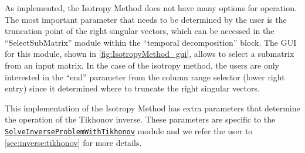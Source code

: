     As implemented, the Isotropy Method does not have many options for operation. The most important parameter that needs to be determined by the user is the truncation point of the right singular vectors, which can be accessed in the ``SelectSubMatrix'' module within the ``temporal decomposition'' block. 
    The GUI for this module, shown in \autoref{fig:IsotropyMethod_gui}, allows to select a submatrix from an input matrix. In the case of the isotropy method, the users are only interested in the ``end'' parameter from the column range selector (lower right entry) since it determined where to truncate the right singular vectors.
    
    This implementation of the Isotropy Method has extra parameters that determine the operation of the Tikhonov inverse. These parameters are specific to the \href{http://scirundocwiki.sci.utah.edu/SCIRunDocs/index.php/CIBC:Documentation:SCIRun:Reference:BioPSE:SolveInverseProblemWithTikhonov}{{\tt SolveInverseProblemWithTikhonov}} module and we refer the user to \autoref{sec:inverse:tikhonov} for more details.
    
    
   

    
